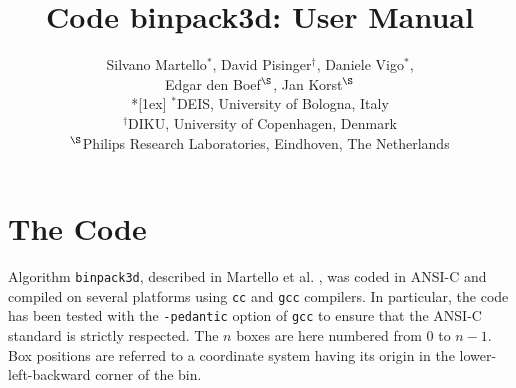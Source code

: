 \newcommand{\stdtable}  {
~\\
\scriptsize\centering\begin{tabular}{|c|r|rrrrr|rrr|r|}\hline
\multicolumn{2}{|c|}{} & \multicolumn{9}{c|}{Class} \\
\cline{3-11} \multicolumn{1}{|c}{packing} & \multicolumn{1}{r|}{$n$} &
\multicolumn{1}{c}{$1$} & \multicolumn{1}{c}{$2$} & \multicolumn{1}{c}{$3$} &
\multicolumn{1}{c}{$4$} & \multicolumn{1}{c|}{$5$}& \multicolumn{1}{c}{$6$} &
\multicolumn{1}{c}{$7$} & \multicolumn{1}{c|}{$8$}& \multicolumn{1}{c|}{$9$}
\\ \hline }


\newcommand{\rev}{\bf}


\title{Code binpack3d: User Manual}
\author{Silvano Martello$^{*}$, David Pisinger$^{\dag}$,
Daniele Vigo$^{*}$,\\ Edgar den Boef$^{\S}$, Jan
Korst$^{\S}$\\*[1ex] $^{*}$DEIS, University of Bologna, Italy \\
$^{\dag}$DIKU, University of Copenhagen, Denmark\\
$^{\S}$Philips
Research Laboratories, Eindhoven, The Netherlands}


\date{}


%




\maketitle


\section{The Code}\label{code}

Algorithm {\tt binpack3d}, described in Martello et al. \cite{MPVBK06},
was coded in ANSI-C and compiled on
several platforms using {\tt cc} and {\tt gcc} compilers. In
particular, the code has been tested with the {\tt -pedantic}
option of {\tt gcc} to ensure that the ANSI-C standard is strictly
respected. The $n$ boxes are here numbered from 0 to $n-1$. Box
positions are referred to a coordinate system having its origin in
the lower-left-backward corner of the bin.

